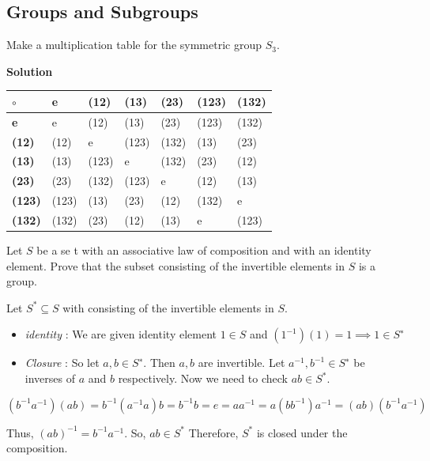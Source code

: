 \documentclass[
]{book}
\begin{document}
\hypertarget{groups-and-subgroups-1}{%
\subsection{Groups and Subgroups}\label{groups-and-subgroups-1}}

\leavevmode{}%
Make a multiplication table for the symmetric group \(S_3\).

\textbf{Solution}

\begin{longtable}[]{@{}lllllll@{}}
\toprule\noalign{}
\(\circ\) & \textbf{e} & (12) & (13) & (23) & (123) & (132) \\
\midrule\noalign{}
\endhead
\bottomrule\noalign{}
\endlastfoot
\textbf{e} & e & (12) & (13) & (23) & (123) & (132) \\
\textbf{(12)} & (12) & e & (123) & (132) & (13) & (23) \\
\textbf{(13)} & (13) & (123) & e & (132) & (23) & (12) \\
\textbf{(23)} & (23) & (132) & (123) & e & (12) & (13) \\
\textbf{(123)} & (123) & (13) & (23) & (12) & (132) & e \\
\textbf{(132)} & (132) & (23) & (12) & (13) & e & (123) \\
\end{longtable}

\leavevmode{}%
Let \(S\) be a se t with an associative law of composition and with an
identity element. Prove that the subset consisting of the invertible
elements in \(S\) is a group.

Let \(S^*\subseteq S\) with consisting of the invertible elements in
\(S\).

\begin{itemize}
\item
  \emph{identity} : We are given identity element \(1 \in S\) and
  \((1^{−1})(1)=1 \implies 1 \in S^∗\)
\item
  \emph{Closure} : So let \(a,b\in S^∗\). Then \(a,b\) are invertible.
  Let \(a^{−1},b^{−1}\in S^∗\) be inverses of \(a\) and \(b\)
  respectively. Now we need to check \(ab\in S^*\).\\
\end{itemize}

\[(b^{−1}a^{−1})(ab)=b^{−1}(a^{−1}a)b=b^{−1}b=e=
  aa^{-1}=a(bb^{−1})a^{−1}=(ab)(b^{−1}a^{−1})\]

Thus, \((ab)^{−1}=b^{−1}a^{−1}\). So, \(ab\in S^*\) Therefore, \(S^*\)
is closed under the composition.
\end{document}
